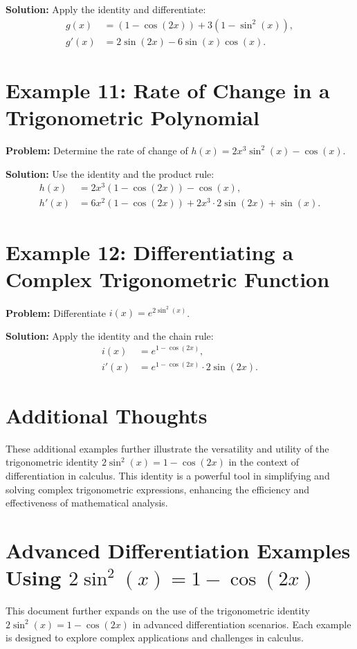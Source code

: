 \documentclass[a4paper,12pt]{book}
\newcounter{example}
\begin{document}
\textbf{Solution:}
Apply the identity and differentiate:
\begin{align*}
g(x) &= (1 - \cos(2x)) + 3(1 - \sin^2(x)), \\
g'(x) &= 2 \sin(2x) - 6 \sin(x) \cos(x).
\end{align*}

\section*{Example 11: Rate of Change in a Trigonometric Polynomial}
\textbf{Problem:} Determine the rate of change of \(h(x) = 2x^3 \sin^2(x) - \cos(x)\).

\textbf{Solution:}
Use the identity and the product rule:
\begin{align*}
h(x) &= 2x^3 (1 - \cos(2x)) - \cos(x), \\
h'(x) &= 6x^2 (1 - \cos(2x)) + 2x^3 \cdot 2 \sin(2x) + \sin(x).
\end{align*}

\section*{Example 12: Differentiating a Complex Trigonometric Function}
\textbf{Problem:} Differentiate \(i(x) = e^{2 \sin^2(x)}\).

\textbf{Solution:}
Apply the identity and the chain rule:
\begin{align*}
i(x) &= e^{1 - \cos(2x)}, \\
i'(x) &= e^{1 - \cos(2x)} \cdot 2 \sin(2x).
\end{align*}

\section*{Additional Thoughts}
These additional examples further illustrate the versatility and utility of the trigonometric identity \(2 \sin^2(x) = 1 - \cos(2x)\) in the context of differentiation in calculus. This identity is a powerful tool in simplifying and solving complex trigonometric expressions, enhancing the efficiency and effectiveness of mathematical analysis.

\section*{Advanced Differentiation Examples Using \(2 \sin^2(x) = 1 - \cos(2x)\)}
This document further expands on the use of the trigonometric identity \(2 \sin^2(x) = 1 - \cos(2x)\) in advanced differentiation scenarios. Each example is designed to explore complex applications and challenges in calculus.
\end{document}
